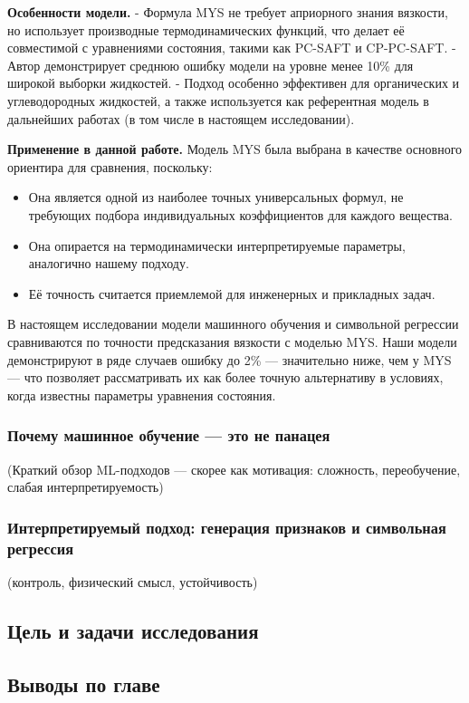 \documentclass[a4paper,12pt]{article}
\begin{document}
\textbf{Особенности модели.}  
- Формула MYS не требует априорного знания вязкости, но использует производные термодинамических функций, что делает её совместимой с уравнениями состояния, такими как PC-SAFT и CP-PC-SAFT.
- Автор демонстрирует среднюю ошибку модели на уровне менее 10\% для широкой выборки жидкостей.
- Подход особенно эффективен для органических и углеводородных жидкостей, а также используется как референтная модель в дальнейших работах (в том числе в настоящем исследовании).

\textbf{Применение в данной работе.}  
Модель MYS была выбрана в качестве основного ориентира для сравнения, поскольку:
\begin{itemize}
  \item Она является одной из наиболее точных универсальных формул, не требующих подбора индивидуальных коэффициентов для каждого вещества.
  \item Она опирается на термодинамически интерпретируемые параметры, аналогично нашему подходу.
  \item Её точность считается приемлемой для инженерных и прикладных задач.
\end{itemize}

В настоящем исследовании модели машинного обучения и символьной регрессии сравниваются по точности предсказания вязкости с моделью MYS. Наши модели демонстрируют в ряде случаев ошибку до 2\% — значительно ниже, чем у MYS — что позволяет рассматривать их как более точную альтернативу в условиях, когда известны параметры уравнения состояния.

    \subsubsection{Почему машинное обучение — это не панацея}
    (Краткий обзор ML-подходов — скорее как мотивация: сложность, переобучение, слабая интерпретируемость)

    \subsubsection{Интерпретируемый подход: генерация признаков и символьная регрессия}
    (контроль, физический смысл, устойчивость)

  \subsection{Цель и задачи исследования}
  \subsection{Выводы по главе}
\newpage
\end{document}
